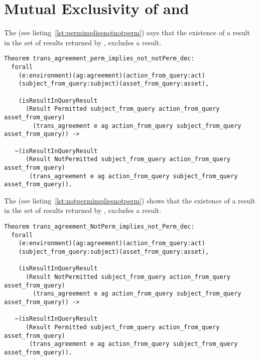 \section{Mutual Exclusivity of  and }\label{sec:mutualexclusive}

The  (see listing~\ref{lst:permimpliesnotnotperm}) says that the existence of a  result in the set of results returned by , excludes a  result.


\begin{minipage}[c]{0.95\textwidth}
\begin{lstlisting}
Theorem trans_agreement_perm_implies_not_notPerm_dec:
  forall
    (e:environment)(ag:agreement)(action_from_query:act)
    (subject_from_query:subject)(asset_from_query:asset),

    (isResultInQueryResult 
      (Result Permitted subject_from_query action_from_query asset_from_query)
        (trans_agreement e ag action_from_query subject_from_query asset_from_query)) ->

   ~(isResultInQueryResult 
      (Result NotPermitted subject_from_query action_from_query asset_from_query)
       (trans_agreement e ag action_from_query subject_from_query asset_from_query)).
\end{lstlisting}
\end{minipage}


The   (see listing~\ref{lst:notpermimpliesnotperm}) shows that the existence of a  result in the set of results returned by , excludes a  result.

\begin{lstlisting}
Theorem trans_agreement_NotPerm_implies_not_Perm_dec:
  forall
    (e:environment)(ag:agreement)(action_from_query:act)
    (subject_from_query:subject)(asset_from_query:asset),

    (isResultInQueryResult 
      (Result NotPermitted subject_from_query action_from_query asset_from_query)
        (trans_agreement e ag action_from_query subject_from_query asset_from_query)) ->

   ~(isResultInQueryResult 
      (Result Permitted subject_from_query action_from_query asset_from_query)
       (trans_agreement e ag action_from_query subject_from_query asset_from_query)).
\end{lstlisting}

